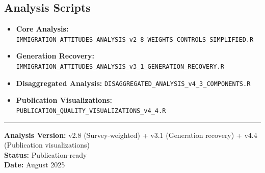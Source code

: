 \documentclass[11pt,letterpaper]{article}
\begin{document}
\subsection{Analysis Scripts}
\begin{itemize}
    \item \textbf{Core Analysis:} \texttt{IMMIGRATION\_ATTITUDES\_ANALYSIS\_v2\_8\_WEIGHTS\_CONTROLS\_SIMPLIFIED.R}
    \item \textbf{Generation Recovery:} \texttt{IMMIGRATION\_ATTITUDES\_ANALYSIS\_v3\_1\_GENERATION\_RECOVERY.R}
    \item \textbf{Disaggregated Analysis:} \texttt{DISAGGREGATED\_ANALYSIS\_v4\_3\_COMPONENTS.R}
    \item \textbf{Publication Visualizations:} \texttt{PUBLICATION\_QUALITY\_VISUALIZATIONS\_v4\_4.R}
\end{itemize}

\vspace{1em}
\noindent\rule{\textwidth}{0.4pt}

\begin{center}
\textbf{Analysis Version:} v2.8 (Survey-weighted) + v3.1 (Generation recovery) + v4.4 (Publication visualizations)\\
\textbf{Status:} Publication-ready\\
\textbf{Date:} August 2025
\end{center}
\end{document}
